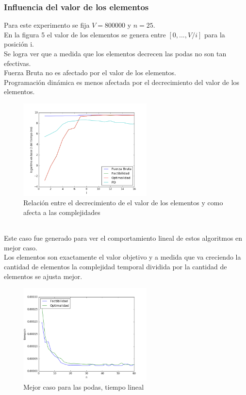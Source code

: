 \subsubsection{Influencia del valor de los elementos}
Para este experimento se fija $V=800000$ y $n=25$.\\
En la figura 5 el valor de los elementos se genera entre $[0,...,V/i]$ para la posición i.\\
Se logra ver que a medida que los elementos decrecen las podas no son tan efectivas.\\
Fuerza Bruta no es afectado por el valor de los elementos.\\
Programaci\'on dinámica es menos afectada por el decrecimiento del valor de los elementos.\\
\begin{figure}[h]
\centering
\includegraphics[width=0.6\textwidth]{todostodos.png}
\caption{Relación entre el decrecimiento de el valor de los elementos y como afecta a las complejidades}
\end{figure}\\
Este caso fue generado para ver el comportamiento lineal de estos algoritmos en mejor caso.\\
Los elementos son exactamente el valor objetivo y a medida que va creciendo la cantidad de elementos la complejidad temporal dividida por la cantidad de elementos se ajusta mejor.
\begin{figure}[h]
\centering
\includegraphics[width=0.6\textwidth]{mejorcasoBack.png}
\caption{Mejor caso para las podas, tiempo lineal}
\end{figure}